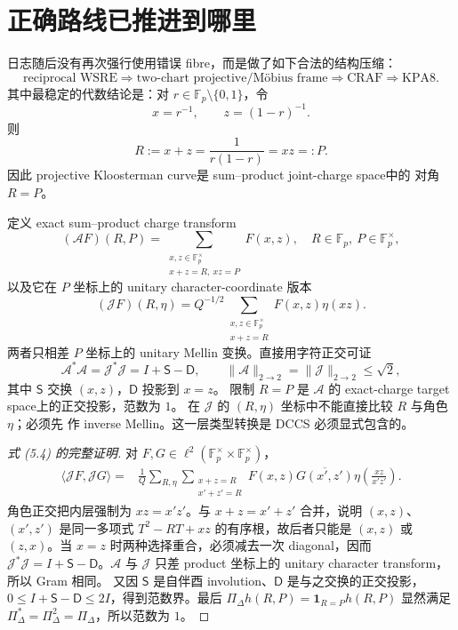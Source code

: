 \documentclass[11pt,a4paper]{ctexart}
\theoremstyle{definition}
\newcommand{\F}{\mathbb F}
\newcommand{\G}{\F_p^\times}
\newcommand{\1}{\mathbf 1}
\begin{document}
\section{正确路线已推进到哪里}

日志随后没有再次强行使用错误 fibre，而是做了如下合法的结构压缩：
\[
\text{reciprocal WSRE}
\Longrightarrow \text{two-chart projective/M\"obius frame}
\Longrightarrow \mathrm{CRAF}
\Longrightarrow \mathrm{KPA8}.
\]
其中最稳定的代数结论是：对 $r\in\F_p\setminus\{0,1\}$，令
\[
x=r^{-1},\qquad z=(1-r)^{-1}.
\]
则
\[
R:=x+z=\frac1{r(1-r)}=xz=:P.
\tag{5.1}
\]
因此 projective Kloosterman curve是 sum--product joint-charge space中的
对角 $R=P$。

定义 exact sum--product charge transform
\[
(\mathcal AF)(R,P)
=\sum_{\substack{x,z\in\G\\x+z=R,\ xz=P}}F(x,z),
\quad R\in\F_p,\ P\in\G,
\tag{5.2}
\]
以及它在 $P$ 坐标上的 unitary character-coordinate 版本
\[
(\mathcal JF)(R,\eta)
=Q^{-1/2}\sum_{\substack{x,z\in\G\\x+z=R}}
F(x,z)\eta(xz).
\tag{5.3}
\]
两者只相差 $P$ 坐标上的 unitary Mellin 变换。直接用字符正交可证
\[
\boxed{\mathcal A^*\mathcal A
=\mathcal J^*\mathcal J=I+\mathsf S-\mathsf D},
\qquad \|\mathcal A\|_{2\to2}=\|\mathcal J\|_{2\to2}\le\sqrt2,
\tag{5.4}
\]
其中 $\mathsf S$ 交换 $(x,z)$，$\mathsf D$ 投影到 $x=z$。
限制 $R=P$ 是 $\mathcal A$ 的 exact-charge target space上的正交投影，范数为 $1$。
在 $\mathcal J$ 的 $(R,\eta)$ 坐标中不能直接比较 $R$ 与角色 $\eta$；必须先
作 inverse Mellin。这一层类型转换是 DCCS 必须显式包含的。

\begin{proof}[式 \textup{(5.4)} 的完整证明]
对 $F,G\in\ell^2(\G\times\G)$，
\begin{align*}
\langle\mathcal JF,\mathcal JG\rangle
={}&\frac1Q\sum_{R,\eta}
\sum_{\substack{x+z=R\\x'+z'=R}}
F(x,z)\overline{G(x',z')}
\eta\!\left(\frac{xz}{x'z'}\right).
\end{align*}
角色正交把内层强制为 $xz=x'z'$。与 $x+z=x'+z'$ 合并，说明
$(x,z)$、$(x',z')$ 是同一多项式 $T^2-RT+xz$ 的有序根，故后者只能是
$(x,z)$ 或 $(z,x)$。当 $x=z$ 时两种选择重合，必须减去一次 diagonal，因而
$\mathcal J^*\mathcal J=I+\mathsf S-\mathsf D$。$\mathcal A$ 与 $\mathcal J$
只差 product 坐标上的 unitary character transform，所以 Gram 相同。
又因 $\mathsf S$ 是自伴酉 involution、$\mathsf D$ 是与之交换的正交投影，
$0\le I+\mathsf S-\mathsf D\le2I$，得到范数界。最后
$\Pi_\Delta h(R,P)=\1_{R=P}h(R,P)$ 显然满足
$\Pi_\Delta^*=\Pi_\Delta^2=\Pi_\Delta$，所以范数为 $1$。
\end{proof}
\end{document}

